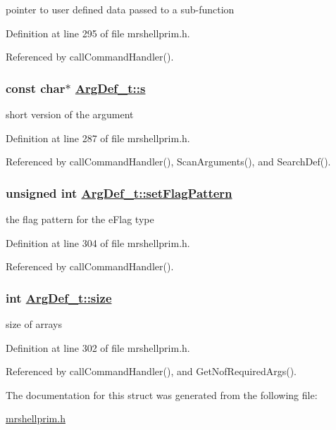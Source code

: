 pointer to user defined data passed to a sub-function 



Definition at line 295 of file mrshellprim.h.

Referenced by call\-Command\-Handler().\hypertarget{structArgDef__t_4ca9eeaa97d70754a94cb018d13f21cd}{
\subsubsection[s]{\setlength{\rightskip}{0pt plus 5cm}const char$\ast$ \hyperlink{structArgDef__t_4ca9eeaa97d70754a94cb018d13f21cd}{Arg\-Def\_\-t::s}}}
\label{structArgDef__t_4ca9eeaa97d70754a94cb018d13f21cd}


short version of the argument 



Definition at line 287 of file mrshellprim.h.

Referenced by call\-Command\-Handler(), Scan\-Arguments(), and Search\-Def().\hypertarget{structArgDef__t_fbd0df81e0a7ea0c1a62a3d1e2680d14}{
\subsubsection[setFlagPattern]{\setlength{\rightskip}{0pt plus 5cm}unsigned int \hyperlink{structArgDef__t_fbd0df81e0a7ea0c1a62a3d1e2680d14}{Arg\-Def\_\-t::set\-Flag\-Pattern}}}
\label{structArgDef__t_fbd0df81e0a7ea0c1a62a3d1e2680d14}


the flag pattern for the e\-Flag type 



Definition at line 304 of file mrshellprim.h.

Referenced by call\-Command\-Handler().\hypertarget{structArgDef__t_6dc5a1f0d48c5a90e40304930d77a0e2}{
\subsubsection[size]{\setlength{\rightskip}{0pt plus 5cm}int \hyperlink{structArgDef__t_6dc5a1f0d48c5a90e40304930d77a0e2}{Arg\-Def\_\-t::size}}}
\label{structArgDef__t_6dc5a1f0d48c5a90e40304930d77a0e2}


size of arrays 



Definition at line 302 of file mrshellprim.h.

Referenced by call\-Command\-Handler(), and Get\-Nof\-Required\-Args().

The documentation for this struct was generated from the following file:\begin{CompactItemize}
\item 
\hyperlink{mrshellprim_8h}{mrshellprim.h}\end{CompactItemize}
